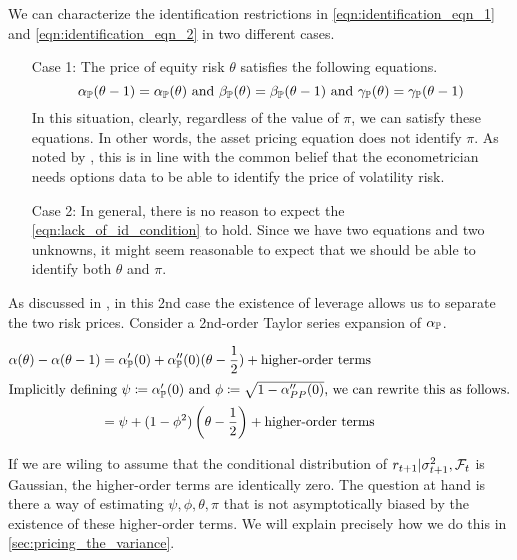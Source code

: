 \documentclass[11pt, letterpaper, twoside, final]{article}
\begin{document}
We can characterize the identification restrictions in \cref{eqn:identification_eqn_1} and
\cref{eqn:identification_eqn_2} in two different cases.   

\begin{enumerate}
    \item[Case 1:] The price of equity risk $\theta$ satisfies the following equations. 
        \begin{equation}
            \alpha_{\PP}(\theta - 1) = \alpha_{\PP}(\theta)\ \text{and}\ \beta_{\PP}(\theta) = \beta_{\PP}(\theta
            -1)\ \text{and}\ \gamma_{\PP}(\theta) = \gamma_{\PP}(\theta - 1)
            \label{eqn:lack_of_id_condition}
        \end{equation}
        In this situation, clearly, regardless of the value of $\pi$, we can satisfy these equations.
        In other words, the asset pricing equation does not identify $\pi$. 
        As noted by \textcite{khrapov2016affine}, this is in line with the common belief that the econometrician
        needs options data to be able to identify the price of volatility risk. 
    \item[Case 2:] 
        In general, there is no reason to expect the \cref{eqn:lack_of_id_condition} to hold.
        Since we have two equations and two unknowns, it might seem reasonable to expect that we should be able to
        identify both $\theta$ and $\pi$.
\end{enumerate}


As discussed in \textcite[13]{khrapov2016affine}, in this 2nd case the existence of leverage allows us to
separate the two risk prices.
Consider a 2nd-order Taylor series expansion of $\alpha_{\mathbb{P}}$.

\begin{align}
    \alpha(\theta) - \alpha(\theta - 1) &= \alpha_{\mathbb{P}}'(0) + \alpha_{\mathbb{P}}''(0) (\theta - \frac{1}{2}) +
    \text{higher-order terms}  \\
    \intertext{Implicitly defining $\psi \coloneqq \alpha_{\mathbb{P}}'(0)$ and $\phi \coloneqq \sqrt{1 -
        \alpha_{PP}''(0)}$, we can rewrite this as follows.} 
        &=  \psi + (1 - \phi^2) \left(\theta - \frac{1}{2}\right) + \text{higher-order terms}  
\end{align}

If we are wiling to assume that the conditional distribution of $r_{t+1} \vert \sigma^2_{t+1}, \mathcal{F}_t$ is Gaussian,
the higher-order terms are identically zero.
The question at hand is there a way of estimating $\psi, \phi, \theta, \pi$ that is not asymptotically biased by
the existence of these higher-order terms.
We will explain precisely how we do this in \cref{sec:pricing_the_variance}.
\end{document}
